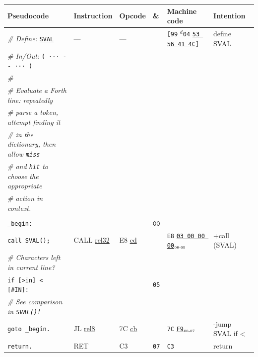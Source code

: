 \documentclass[a4paper,12pt,final]{article}
\begin{document}
\begin{table}[!htbp] \begin{adjustwidth}{-1cm}{-1cm} \fontsize{9}{10.800000}\selectfont
\begin{center}
\begin{tabular}{l|ll|l|lH}
\textbf{Pseudocode} & \textbf{Instruction} & \textbf{Opcode} & \textbf{\&} & \textbf{Machine code} & \textbf{Intention}\\[0pt]
\hline
\emph{\# Define:} \uline{\texttt{SVAL}} & --- & --- &  & \texttt{[99} \(^{d}\)​\texttt{04} \uline{\texttt{53 56 41 4C}}​\texttt{]} & define SVAL\\[0pt]
\emph{\# In/Out:} \texttt{( ··· -{}-{} ··· )} &  &  &  &  & \\[0pt]
\emph{\#} &  &  &  &  & \\[0pt]
\emph{\# Evaluate a Forth line: repeatedly} &  &  &  &  & \\[0pt]
\emph{\# parse a token, attempt finding it} &  &  &  &  & \\[0pt]
\emph{\# in the dictionary, then allow \texttt{miss}} &  &  &  &  & \\[0pt]
\emph{\# and \texttt{hit} to choose the appropriate} &  &  &  &  & \\[0pt]
\emph{\# action in context.} &  &  &  &  & \\[0pt]
 &  &  &  &  & \\[0pt]
\texttt{\_begin:} &  &  & \(\overline{\texttt{00}}\) &  & \\[0pt]
\hspace{1.053000em} \texttt{call SVAL();} & CALL \uline{rel32} & E8 \uline{cd} &  & \texttt{E8} \uline{\texttt{03 00 00 00}}​\(_{\text{\tiny 08-05}}\) & +call (SVAL)\\[0pt]
\hspace{1.053000em} \emph{\# Characters left in current line?} &  &  &  &  & \\[0pt]
\hspace{1.053000em} \texttt{if [>in] < [\#IN]:} &  &  & \texttt{05} &  & \\[0pt]
\hspace{2.106000em}   \emph{\# See comparison in \texttt{SVAL()}!} &  &  &  &  & \\[0pt]
\hspace{2.106000em}   \texttt{goto \_begin.} & JL \uline{rel8} & 7C \uline{cb} &  & \texttt{7C} \uline{\texttt{F9}}​\(_{\text{\tiny 00-07}}\) & -jump SVAL if <\\[0pt]
\hspace{1.053000em} \texttt{return.} & RET & C3 & \texttt{07} & \texttt{C3} & return\\[0pt]

\end{tabular}
\end{center}
\end{adjustwidth}
\end{table}
\end{document}

